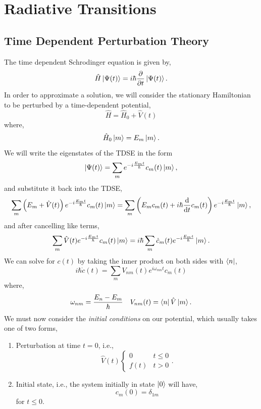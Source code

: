 \documentclass{book}
\begin{document}
\chapter{Radiative Transitions}
\section{Time Dependent Perturbation Theory}
The time dependent Schrodinger equation is given by,
\begin{equation}
	\hat{H}\ket{\Psi(t)} = i\hbar \pdv{t}\ket{\Psi(t)}.
\end{equation}
In order to approximate a solution, we will consider the stationary Hamiltonian to be perturbed by a time-dependent potential,
\begin{equation}
	\hat{H} = \hat{H}_0 + \hat{V}(t)
\end{equation}
where,
\begin{equation}
	\hat{H}_0 \ket{m} = E_m\ket{m}.
\end{equation}
We will write the eigenstates of the TDSE in the form
\begin{equation}
	\ket{\Psi(t)} = \sum_m e^{-i\frac{E_mt}{\hbar}}c_m(t)\ket{m},
\end{equation}
and substitute it back into the TDSE,
\begin{equation}
	\sum_m\left(E_m+\hat{V}(t)\right)e^{-i\frac{E_mt}{\hbar}}c_m(t)\ket{m} = \sum_m \left(E_m c_m(t) + i \hbar \dv{t}c_m(t)\right)e^{-i\frac{E_mt}{\hbar}}\ket{m},
\end{equation}
and after cancelling like terms,
\begin{equation}
	\sum_m \hat{V} (t)e^{-i\frac{E_mt}{\hbar}}c_m(t)\ket{m} = i\hbar\sum_m\dot{c}_m(t)e^{-i\frac{E_mt}{\hbar}}\ket{m}.
\end{equation}
We can solve for $c(t)$ by taking the inner product on both sides with $\bra{n}$,
\begin{equation}
	i\hbar \dot{c}(t) = \sum_m V_{nm}(t)e^{i\omega_{mn}t}c_m(t) \label{eq:6}
\end{equation}
where,
\begin{align}
	\omega_{nm} = \frac{E_n - E_m}{\hbar} && V_{nm}(t) = \bra{n}\hat{V}\ket{m}.
\end{align}
We must now consider the \textit{initial conditions} on our potential, which usually takes one of two forms,
\begin{enumerate}
	\item Perturbation at time $t=0$, i.e.,
	\begin{equation}
		\hat{V}(t) \begin{cases}
			0 & t \leq 0 \\
			f(t) & t > 0
		\end{cases}.
	\end{equation}
	\item Initial state, i.e., the system initially in state $\ket{0}$ will have,
	\begin{equation}
		c_m (0) = \delta_{1m}
	\end{equation}
	for $t \leq 0$.
\end{enumerate}
\end{document}
